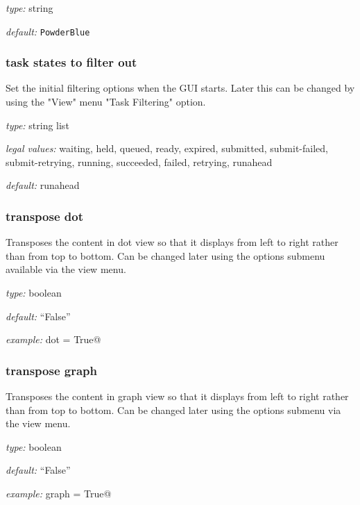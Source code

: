 \begin{myitemize}
    \item {\em type:} string
    \item {\em default:} \lstinline=PowderBlue=
\end{myitemize}


\subsubsection{task states to filter out}

Set the initial filtering options when the GUI starts. Later this can be
changed by using the "View" menu "Task Filtering" option.

\begin{myitemize}
\item {\em type:} string list
\item {\em legal values:} waiting, held, queued, ready, expired, submitted,
submit-failed, submit-retrying, running, succeeded, failed, retrying, runahead
\item {\em default:} runahead
\end{myitemize}


\subsubsection{transpose dot}

Transposes the content in dot view so that it displays from left to right rather
than from top to bottom. Can be changed later using the options submenu
available via the view menu.

\begin{myitemize}
    \item {\em type:} boolean
    \item {\em default:} ``False''
    \item {\em example:} \lstinline@transpose dot = True@
\end{myitemize}


\subsubsection{transpose graph}

Transposes the content in graph view so that it displays from left to right
rather than from top to bottom. Can be changed later using the options submenu
via the view menu.

\begin{myitemize}
    \item {\em type:} boolean
    \item {\em default:} ``False''
    \item {\em example:} \lstinline@transpose graph = True@
\end{myitemize}


